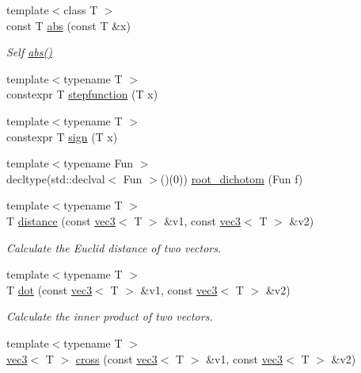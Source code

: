\begin{DoxyCompactItemize}
{\footnotesize template$<$class T $>$ }\\const T \mbox{\hyperlink{namespace_space_h_a90bc8cc5a4fc9c2a7353f9bfe7d5684d}{abs}} (const T \&x)
\begin{DoxyCompactList}\small\item\em Self \mbox{\hyperlink{namespace_space_h_a90bc8cc5a4fc9c2a7353f9bfe7d5684d}{abs()}} \end{DoxyCompactList}\item 
{\footnotesize template$<$typename T $>$ }\\constexpr T \mbox{\hyperlink{namespace_space_h_acb1ae0f3496d4c85d444895d61bfae15}{stepfunction}} (T x)
\item 
{\footnotesize template$<$typename T $>$ }\\constexpr T \mbox{\hyperlink{namespace_space_h_a14683e2d8fb2395aa4821be534fb8b15}{sign}} (T x)
\item 
{\footnotesize template$<$typename Fun $>$ }\\decltype(std\+::declval$<$ Fun $>$()(0)) \mbox{\hyperlink{namespace_space_h_a90388dcbf862ea6a3bf4fb5563e4b236}{root\+\_\+dichotom}} (Fun f)
\item 
{\footnotesize template$<$typename T $>$ }\\T \mbox{\hyperlink{namespace_space_h_a889a97546c28125c77c00557ab96b496}{distance}} (const \mbox{\hyperlink{struct_space_h_1_1vec3}{vec3}}$<$ T $>$ \&v1, const \mbox{\hyperlink{struct_space_h_1_1vec3}{vec3}}$<$ T $>$ \&v2)
\begin{DoxyCompactList}\small\item\em Calculate the Euclid distance of two vectors. \end{DoxyCompactList}\item 
{\footnotesize template$<$typename T $>$ }\\T \mbox{\hyperlink{namespace_space_h_a8a469adb735b3a1d5c15b4a97278ad51}{dot}} (const \mbox{\hyperlink{struct_space_h_1_1vec3}{vec3}}$<$ T $>$ \&v1, const \mbox{\hyperlink{struct_space_h_1_1vec3}{vec3}}$<$ T $>$ \&v2)
\begin{DoxyCompactList}\small\item\em Calculate the inner product of two vectors. \end{DoxyCompactList}\item 
{\footnotesize template$<$typename T $>$ }\\\mbox{\hyperlink{struct_space_h_1_1vec3}{vec3}}$<$ T $>$ \mbox{\hyperlink{namespace_space_h_a727e2b0f9ab708eae35574e22b3ef329}{cross}} (const \mbox{\hyperlink{struct_space_h_1_1vec3}{vec3}}$<$ T $>$ \&v1, const \mbox{\hyperlink{struct_space_h_1_1vec3}{vec3}}$<$ T $>$ \&v2)

\end{DoxyCompactItemize}
